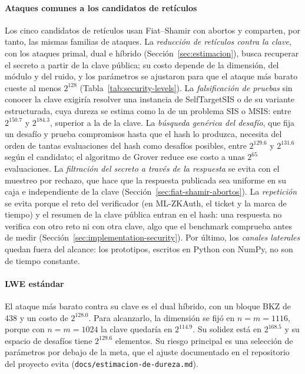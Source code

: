 \paragraph{Ataques comunes a los candidatos de retículos}
Los cinco candidatos de retículos usan Fiat--Shamir con abortos y comparten, por tanto, las mismas familias de ataques. La \textit{reducción de retículos contra la clave}, con los ataques primal, dual e híbrido (Sección~\ref{sec:estimacion}), busca recuperar el secreto a partir de la clave pública; su costo depende de la dimensión, del módulo y del ruido, y los parámetros se ajustaron para que el ataque más barato cueste al menos $2^{128}$ (Tabla~\ref{tab:security-levels}). La \textit{falsificación de pruebas} sin conocer la clave exigiría resolver una instancia de SelfTargetSIS o de su variante estructurada, cuya dureza se estima como la de un problema SIS o MSIS: entre $2^{150.7}$ y $2^{184.3}$, superior a la de la clave. La \textit{búsqueda genérica del desafío}, que fija un desafío y prueba compromisos hasta que el hash lo produzca, necesita del orden de tantas evaluaciones del hash como desafíos posibles, entre $2^{129.6}$ y $2^{131.6}$ según el candidato; el algoritmo de Grover reduce ese costo a unas $2^{65}$ evaluaciones. La \textit{filtración del secreto a través de la respuesta} se evita con el muestreo por rechazo, que hace que la respuesta publicada sea uniforme en su caja e independiente de la clave (Sección~\ref{sec:fiat-shamir-abortos}). La \textit{repetición} se evita porque el reto del verificador (en ML-ZKAuth, el ticket y la marca de tiempo) y el resumen de la clave pública entran en el hash: una respuesta no verifica con otro reto ni con otra clave, algo que el benchmark comprueba antes de medir (Sección~\ref{sec:implementation-security}). Por último, los \textit{canales laterales} quedan fuera del alcance: los prototipos, escritos en Python con NumPy, no son de tiempo constante.

\paragraph{LWE estándar}
El ataque más barato contra su clave es el dual híbrido, con un bloque BKZ de 438 y un costo de $2^{128.0}$. Para alcanzarlo, la dimensión se fijó en $n = m = 1116$, porque con $n = m = 1024$ la clave quedaría en $2^{114.9}$. Su solidez está en $2^{168.5}$ y su espacio de desafíos tiene $2^{129.6}$ elementos. Su riesgo principal es una selección de parámetros por debajo de la meta, que el ajuste documentado en el repositorio del proyecto evita (\texttt{docs/estimacion-de-dureza.md}).

